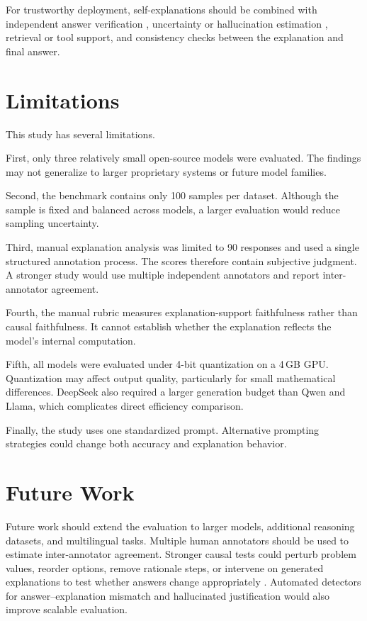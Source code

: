 \documentclass{article}
\begin{document}
For trustworthy deployment, self-explanations should be combined with independent answer verification \cite{weng2023selfverification}, uncertainty or hallucination estimation \cite{manakul2023selfcheckgpt,farquhar2024semantic}, retrieval or tool support, and consistency checks between the explanation and final answer.


\section{Limitations}

This study has several limitations.

First, only three relatively small open-source models were evaluated. The findings may not generalize to larger proprietary systems or future model families.

Second, the benchmark contains only 100 samples per dataset. Although the sample is fixed and balanced across models, a larger evaluation would reduce sampling uncertainty.

Third, manual explanation analysis was limited to 90 responses and used a single structured annotation process. The scores therefore contain subjective judgment. A stronger study would use multiple independent annotators and report inter-annotator agreement.

Fourth, the manual rubric measures explanation-support faithfulness rather than causal faithfulness. It cannot establish whether the explanation reflects the model's internal computation.

Fifth, all models were evaluated under 4-bit quantization on a 4\,GB GPU. Quantization may affect output quality, particularly for small mathematical differences. DeepSeek also required a larger generation budget than Qwen and Llama, which complicates direct efficiency comparison.

Finally, the study uses one standardized prompt. Alternative prompting strategies could change both accuracy and explanation behavior.


\section{Future Work}

Future work should extend the evaluation to larger models, additional reasoning datasets, and multilingual tasks. Multiple human annotators should be used to estimate inter-annotator agreement. Stronger causal tests could perturb problem values, reorder options, remove rationale steps, or intervene on generated explanations to test whether answers change appropriately \cite{lanham2023measuring,matton2025walk,zaman2025causal}. Automated detectors for answer--explanation mismatch and hallucinated justification would also improve scalable evaluation.
\end{document}
